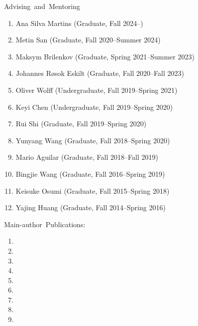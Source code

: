 \documentclass[a4paper]{resume}
\begin{document}
\begin{category}{\mbox{Advising and Mentoring}}
    \citemnobullet
    \noindent
    \begin{enumerate}[topsep=0pt,itemsep=0pt,partopsep=0pt,parsep=0pt]
	    \item Ana Silva Martins (Graduate, Fall 2024--)
        \item Metin San (Graduate, Fall 2020--Summer 2024)
        \item Maksym Brilenkov (Graduate, Spring 2021--Summer 2023)
        \item Johannes Røsok Eskilt (Graduate, Fall 2020--Fall 2023)
	\item Oliver Wolff (Undergraduate, Fall 2019--Spring 2021)
        \item Keyi Chen (Undergraduate, Fall 2019--Spring 2020)
        \item Rui Shi (Graduate, Fall 2019--Spring 2020)
	\item Yunyang Wang (Graduate, Fall 2018--Spring 2020)
        \item Mario Aguilar (Graduate, Fall 2018--Fall 2019)
        \item Bingjie Wang (Graduate, Fall 2016--Spring 2019)
        \item Keisuke Osumi (Graduate, Fall 2015--Spring 2018)
        \item Yajing Huang (Graduate, Fall 2014--Spring 2016)
    \end{enumerate}
\end{category}


\begin{category}{\mbox{Main-author Publications:}}
\citemnobullet\\
%

\noindent
\begin{enumerate}[topsep=0pt,itemsep=0pt,partopsep=0pt,parsep=0pt]
\item {}
\item {}
\item {}
\item {}
\item {}
\item {}
\item {}
\item {}
\item {}
\end{enumerate}
\end{category}
\end{document}

